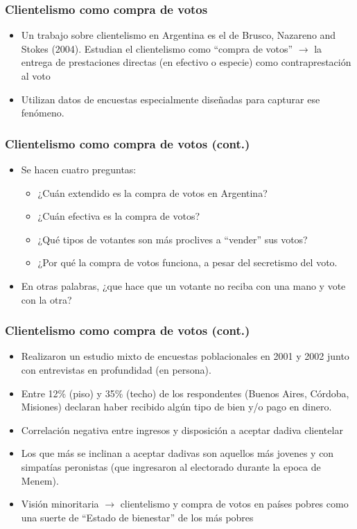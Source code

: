 \documentclass[handout,final,xcolor=dvipsnames]{beamer}
\begin{document}
  

    \begin{frame}\frametitle{Clientelismo como compra de votos}
  \begin{itemize}\itemsep 10pt
      \item Un trabajo sobre clientelismo en Argentina es el de
        Brusco, Nazareno and Stokes (2004). Estudian el clientelismo
        como ``compra de votos'' $\longrightarrow$ la entrega de
        prestaciones directas (en efectivo o especie) como
        contraprestación al voto
        \item Utilizan datos de encuestas especialmente diseñadas para
          capturar ese fenómeno. 
    \end{itemize}
  \end{frame}


    \begin{frame}\frametitle{Clientelismo como compra de votos (cont.)}
  \begin{itemize}\itemsep 10pt
  \item Se hacen cuatro preguntas:
    \begin{itemize}\itemsep 5pt \medskip
    \item ¿Cuán extendido es la compra de votos en Argentina?
    \item ¿Cuán efectiva es la compra de votos?
      \item ¿Qué tipos de votantes son más proclives a ``vender'' sus
        votos?
        \item ¿Por qué la compra de votos funciona, a pesar del
          secretismo del voto. 
        \end{itemize}
        \item En otras palabras, ¿que hace que un votante no reciba
          con una mano y vote con la otra?
    \end{itemize}
  \end{frame}


  
    \begin{frame}\frametitle{Clientelismo como compra de votos (cont.)}
  \begin{itemize}\itemsep 10pt
  \item Realizaron un estudio mixto de encuestas poblacionales en 2001 y 2002 junto
    con entrevistas en profundidad (en persona).
    \item Entre 12\% (piso) y 35\% (techo) de los respondentes (Buenos Aires,
      Córdoba, Misiones) declaran haber recibido algún tipo de bien
      y/o pago en dinero.
      \item Correlación negativa entre ingresos y disposición a
        aceptar dadiva clientelar
        \item Los que más se inclinan a aceptar dadivas son aquellos
          más jovenes y con simpatías peronistas (que ingresaron al
          electorado durante la epoca de Menem).
          \item Visión minoritaria $\longrightarrow$ clientelismo y
            compra de votos en países pobres como una suerte de ``Estado
            de bienestar'' de los más pobres
    \end{itemize}
  \end{frame}
\end{document}
